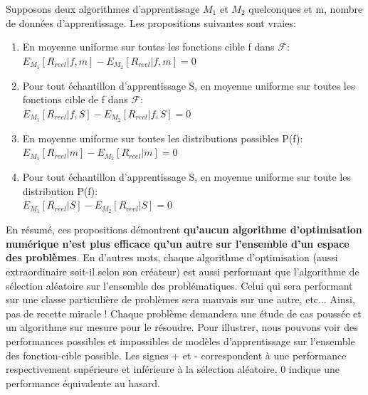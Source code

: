 \noindent Supposons deux algorithmes d'apprentissage $M_1$ et $M_2$ quelconques et m, nombre de données d'apprentissage. Les propositions suivantes sont vraies:
\begin{enumerate}
    \item En moyenne uniforme sur toutes les fonctions cible f dans $\mathcal{F}$:\\
    $E_{M_1}[R_{reel}|f,m]-E_{M_2}[R_{reel}|f,m]=0$\\

    \item Pour tout échantillon d'apprentissage S, en moyenne uniforme sur toutes les fonctions cible de f dans $\mathcal{F}$:\\
    $E_{M_1}[R_{reel}|f,S]-E_{M_2}[R_{reel}|f,S]=0$\\

    \item En moyenne uniforme sur toutes les distributions possibles P(f):\\
    $E_{M_1}[R_{reel}|m]-E_{M_2}[R_{reel}|m]=0$\\

    \item Pour tout échantillon d'apprentissage S, en moyenne uniforme sur toute les distribution P(f):\\
    $E_{M_1}[R_{reel}|S]-E_{M_2}[R_{reel}|S]=0$\\
\end{enumerate}

\noindent En résumé, ces propositions démontrent \textbf{qu'aucun algorithme d'optimisation numérique n'est plus efficace qu'un autre sur l'ensemble d'un espace des problèmes}. En d'autres mots, chaque algorithme d'optimisation (aussi extraordinaire soit-il selon son créateur) est aussi performant que l'algorithme de sélection aléatoire sur l'ensemble des problématiques. Celui qui sera performant sur une classe particulière de problèmes sera mauvais sur une autre, etc... Ainsi, pas de recette miracle ! Chaque problème demandera une étude de cas poussée et un algorithme sur mesure pour le résoudre. Pour illustrer, nous pouvons voir des performances possibles et impossibles de modèles d'apprentissage sur l'ensemble des fonction-cible possible. Les signes + et - correspondent à une performance respectivement supérieure et inférieure à la sélection aléatoire. 0 indique une performance équivalente au hasard.\\

